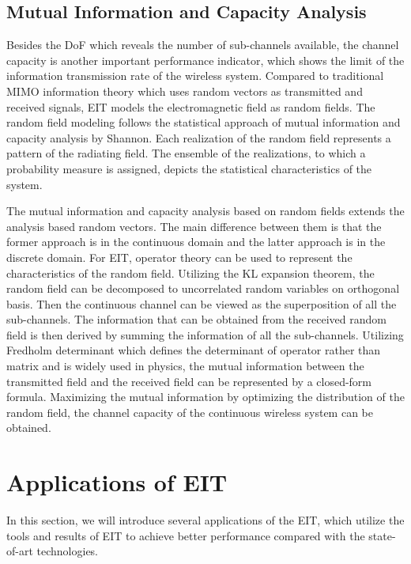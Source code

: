 \documentclass[journal,twocolumn]{IEEEtran}
\begin{document}
\subsection{Mutual Information and Capacity Analysis}
Besides the DoF which reveals the number of sub-channels available, the channel capacity is another important performance indicator, which shows the limit of the information transmission rate of the wireless system. Compared to traditional MIMO information theory which uses random vectors as transmitted and received signals, EIT models the electromagnetic field as random fields. The random field modeling follows the statistical approach of mutual information and capacity analysis by Shannon. Each realization of the random field represents a pattern of the radiating field. The ensemble of the realizations, to which a probability measure is assigned, depicts the statistical characteristics of the system. 

The mutual information and capacity analysis based on random fields extends the  analysis based random vectors. The main difference between them is that the former approach is in the continuous domain and the latter approach is in the discrete domain. For EIT, operator theory can be used to represent the characteristics of the random field. 
Utilizing the KL expansion theorem, the random field can be decomposed to uncorrelated random variables on orthogonal basis. Then the continuous channel can be viewed as the superposition of all the sub-channels. The information that can be obtained from the received random field is then derived by summing the information of all the sub-channels. Utilizing Fredholm determinant which defines the determinant of operator rather than matrix and is widely used in physics, the mutual information between the transmitted field and the received field can be represented by a closed-form formula. Maximizing the mutual information by optimizing the distribution of the random field, the channel capacity of the continuous wireless system can be obtained. 

\section{Applications of EIT}
In this section, we will introduce several applications of the EIT, which utilize the tools and results of EIT to achieve better performance compared with the state-of-art technologies.
\end{document}
